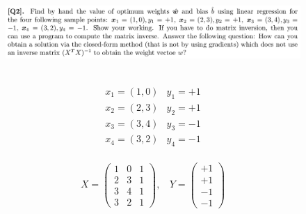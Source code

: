 \documentclass[12pt]{article}
\newenvironment{solution}[2][Solution]{\begin{trivlist}
\item[\hskip \labelsep {\bfseries #1}]}{\end{trivlist}}
\begin{document}
\pagebreak

\begin{figure}[h!]
\includegraphics[width=\linewidth]{./assets/201805292053.png}
\end{figure}

\begin{solution}{}~
$$\begin{array}{ll} 
x_1=(1,0) & y_1=+1\\
x_2=(2,3) & y_2=+1\\
x_3=(3,4) & y_3=-1\\
x_4=(3,2) & y_4=-1
\end{array}$$
~\\
$$X=\left(\begin{array}{ccc}
         1 & 0 & 1\\
         2 & 3 & 1\\
         3 & 4 & 1\\
         3 & 2 & 1
         \end{array}\right),\ \ \ \ 
Y=\left(\begin{array}{c}
         +1\\
         +1\\
         -1\\
         -1
         \end{array}\right)$$


\end{solution}
\end{document}
